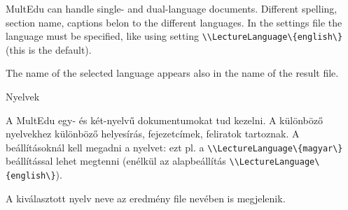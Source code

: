 {
MultEdu can handle single- and dual-language documents.
Different spelling, section name, captions belon to the different languages. In the settings file the language must be specified,
like using setting \lstinline|\\LectureLanguage\{english\}| (this is the default).

The name of the selected language appears also in the name of the result file.
}
{Nyelvek}
{
A MultEdu egy- és két-nyelvű dokumentumokat tud kezelni.
A különböző nyelvekhez különböző helyesírás, fejezetcímek, feliratok tartoznak. A beállításoknál kell megadni a nyelvet: ezt pl. a \lstinline|\\LectureLanguage\{magyar\}| beállítással lehet megtenni
(enélkül az alapbeállítás \lstinline|\\LectureLanguage\{english\}|).

A kiválasztott nyelv neve az eredmény file nevében is megjelenik.
}

